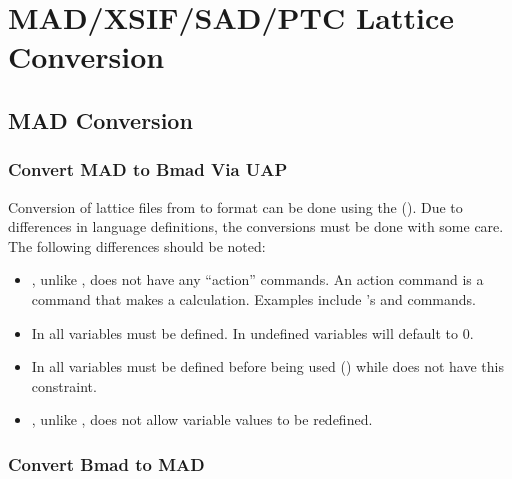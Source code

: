 \chapter{MAD/XSIF/SAD/PTC Lattice Conversion}
\label{c:lat.convert}

\section{MAD Conversion}
\label{s:mad.convert}

\subsection{Convert MAD to Bmad Via UAP}
\label{s:mad.bmad.uap}

Conversion of lattice files from \mad to \bmad format can be done using the  (). 
Due to differences in language definitions, the conversions must be done with some
care. The following differences should be noted:
  \begin{itemize}
  \item
\bmad, unlike \mad, does not have any ``action'' commands. An action
command is a command that makes a calculation. Examples include \mad's
 and  commands.
  \item
In \bmad all variables must be defined. In \mad undefined variables
will default to 0.
  \item
In \bmad all variables must be defined before being used
() while \mad does not have this constraint.
  \item
\bmad, unlike \mad, does not allow variable values to be redefined.
  \end{itemize}

\subsection{Convert Bmad to MAD}
\label{s:bmad.mad}

